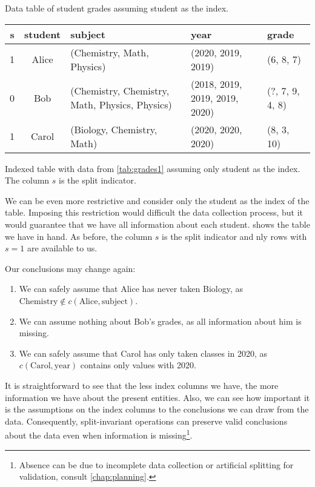 \begin{tablebox}[label=tab:grades3]{Data table of student grades assuming student as the index.}
  \centering
  \begin{tabular}{ccp{2.6cm}p{1.8cm}>{\raggedright\arraybackslash}p{1.2cm}}
    \toprule
    \textbf{s} & \textbf{student} & \textbf{subject} & \textbf{year} & \textbf{grade} \\
    \midrule
    1 & Alice & (Chemistry, Math, Physics) & (2020, 2019, 2019) & (6, 8, 7) \\
    0 & Bob & (Chemistry, Chemistry, Math, Physics, Physics) & (2018, 2019, 2019, 2019, 2020) & (?, 7, 9, 4, 8) \\
    1 & Carol & (Biology, Chemistry, Math) & (2020, 2020, 2020) & (8, 3, 10) \\
    \bottomrule
  \end{tabular}
  \tcblower
  Indexed table with data from \cref{tab:grades1} assuming only student
  as the index.  The column $s$ is the split indicator.
\end{tablebox}

We can be even more restrictive and consider only the student as the index of the table.
Imposing this restriction would difficult the data collection process, but it would
guarantee that we have all information about each student.   shows the
table we have in hand.  As before, the column $s$ is the split indicator and nly rows with
$s = 1$ are available to us.

Our conclusions may change again:
\begin{enumerate}
  \itemsep0em
  \item We can safely assume that Alice has never taken Biology, as $\text{Chemistry}
    \not\in c(\text{Alice}, \text{subject})$.
  \item We can assume nothing about Bob's grades, as all information about him is missing.
  \item We can safely assume that Carol has only taken classes in 2020, as $c(\text{Carol},
    \text{year})$ contains only values with 2020.
\end{enumerate}

It is straightforward to see that the less index columns we have, the more information we
have about the present entities.  Also, we can see how important it is the assumptions on
the index columns to the conclusions we can draw from the data.  Consequently,
split-invariant operations can preserve valid conclusions about the data even when
information is missing\footnote{Absence can be due to incomplete data collection or
artificial splitting for validation, consult \cref{chap:planning}.}.

